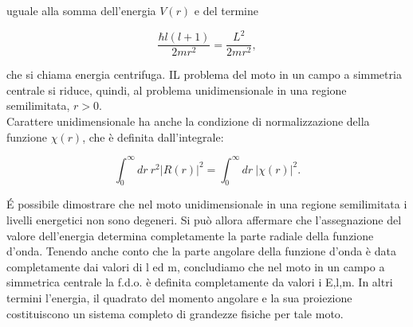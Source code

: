 \documentclass[a4paper,12pt,oneside]{book}
\begin{document}
uguale alla somma dell'energia $V\left(r\right)$ e del termine

\begin{equation}
\frac{\hbar l\left(l+1\right)}{2mr^2}=\frac{L^2}{2mr^2} ,
\end{equation}

che si chiama energia centrifuga. IL problema del moto in un campo a simmetria centrale si riduce, quindi, al problema unidimensionale in una regione semilimitata, $r>0$.\\
Carattere unidimensionale ha anche la condizione di normalizzazione della funzione $\chi\left(r\right)$, che è definita dall'integrale:

\begin{equation}
\int_0^\infty dr\ r^2|R\left(r\right)|^2=\int_0^\infty dr\ |\chi\left(r\right)|^2 .
\end{equation}

É possibile dimostrare che nel moto unidimensionale in una regione semilimitata i livelli energetici non sono degeneri. Si può allora affermare che l'assegnazione del valore dell'energia determina completamente la parte radiale della funzione d'onda. Tenendo anche conto che la parte angolare della funzione d'onda è data completamente dai valori di l ed m, concludiamo che nel moto in un campo a simmetrica centrale la f.d.o. è definita completamente da valori i E,l,m. In altri termini l'energia, il quadrato del momento angolare e la sua proiezione costituiscono un sistema completo di grandezze fisiche per tale moto.
\end{document}
